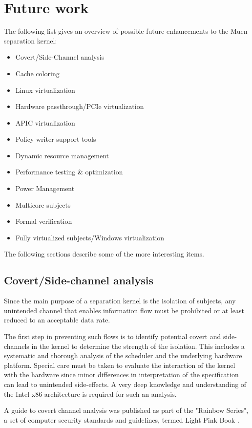 \section{Future work}
The following list gives an overview of possible future enhancements to the
Muen separation kernel:

\begin{itemize}
	\item Covert/Side-Channel analysis
	\item Cache coloring
	\item Linux virtualization
	\item Hardware passthrough/PCIe virtualization
	\item APIC virtualization
	\item Policy writer support tools
	\item Dynamic resource management
	\item Performance testing \& optimization
	\item Power Management
	\item Multicore subjects
	\item Formal verification
	\item Fully virtualized subjects/Windows virtualization
\end{itemize}

The following sections describe some of the more interesting items.

\subsection{Covert/Side-channel analysis}
Since the main purpose of a separation kernel is the isolation of subjects, any
unintended channel that enables information flow must be prohibited or at least
reduced to an acceptable data rate.

The first step in preventing such flows is to identify potential covert and
side-channels in the kernel to determine the strength of the isolation. This
includes a systematic and thorough analysis of the scheduler and the underlying
hardware platform. Special care must be taken to evaluate the interaction of the
kernel with the hardware since minor differences in interpretation of the
specification can lead to unintended side-effects. A very deep knowledge and
understanding of the Intel x86 architecture is required for such an analysis.

A guide to covert channel analysis was published as part of the "Rainbow
Series", a set of computer security standards and guidelines, termed Light Pink
Book \cite{LightPinkBook}.

